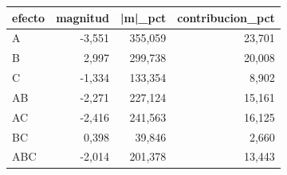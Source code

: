 \begin{tabular}{lrrr}
\toprule
efecto & magnitud & |m|\_pct & contribucion\_pct \\
\midrule
A &                 -3,551 &              355,059 &                23,701 \\
B &                2,997 &              299,738 &               20,008 \\
C &                 -1,334 &            133,354 &                8,902 \\
AB &                -2,271 &              227,124 &                15,161 \\
AC &                 -2,416 &               241,563 &                16,125 \\
BC &                0,398 &              39,846 &                2,660 \\
ABC &                -2,014 &              201,378 &               13,443 \\
\bottomrule
\end{tabular}
